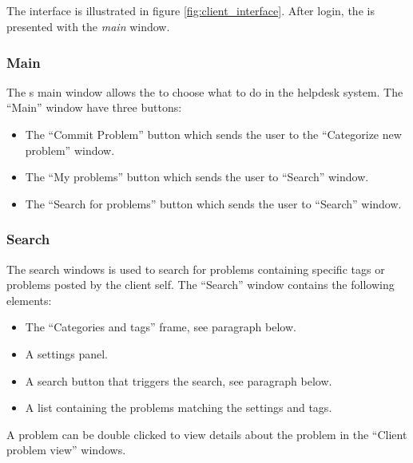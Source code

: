 \subsection{\cinterface}
\label{sec:client_interface}

The \aclient interface is illustrated in figure \ref{fig:client_interface}.
After login, the \aclient[] is presented with the \textit{main} window. 

\subsubsection{Main}
The \aclient s main window allows the \aclient to choose what to do in the helpdesk system. The ``Main'' window have three buttons:
\begin{itemize}
	\item The ``Commit Problem'' button which sends the user to the ``Categorize new problem'' window.
	\item The ``My problems'' button which sends the user to ``Search'' window.
	\item The ``Search for problems'' button which sends the user to ``Search'' window.
\end{itemize}


\subsubsection{Search}
The search windows is used to search for problems containing specific tags or problems posted by the client self. The ``Search'' window contains the following elements:
\begin{itemize}
	\item The ``Categories and tags'' frame, see paragraph below.
	\item A settings panel.
	\item A search button that triggers the search, see paragraph below.
	\item A list containing the problems matching the settings and tags.
\end{itemize}
A problem can be double clicked to view details about the problem in the ``Client problem view'' windows.


